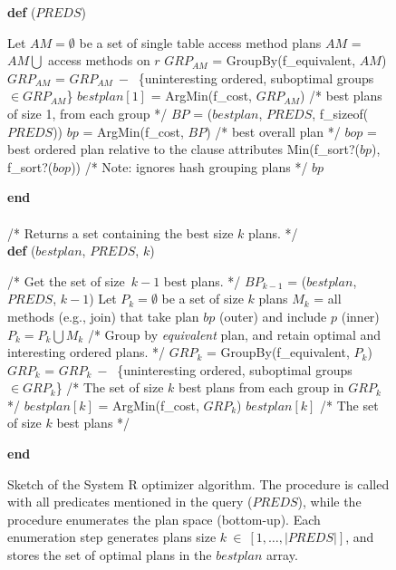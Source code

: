 \begin{figure*}
\ssp
\centering
\begin{boxedminipage}{\linewidth}
  {\bf def} ($PREDS$)
    \begin{algorithmic}[1]
	\STATE Let $AM = \emptyset$ be a set of single table access method plans
		\STATE $AM$ = $AM \bigcup$ access methods on $r$
  	\ENDFOR
	\STATE
	\STATE $GRP_{AM}$ = GroupBy(f\_equivalent, $AM$)
	\STATE $GRP_{AM}$ = $GRP_{AM}\ -\ $ \{uninteresting ordered, suboptimal groups $\in GRP_{AM}$\}
	\STATE $bestplan[1]$ = ArgMin(f\_cost, $GRP_{AM}$) /* best plans of size 1, from each group */
	\STATE $BP$ = ($bestplan$, $PREDS$, f\_sizeof($PREDS$)) 
	\STATE $bp$ = ArgMin(f\_cost, $BP$) /* best overall plan */
	\STATE
		\STATE $bop$ = best ordered plan relative to the clause attributes
		\RETURN Min(f\_sort?($bp$), f\_sort?($bop$)) /* Note: ignores hash grouping plans */
	\ELSE
	 	\RETURN $bp$
	\ENDIF
    \end{algorithmic}
  {\bf end}
  \\
  \\
  /* Returns a set containing the best size $k$ plans. */ \\
  {\bf def} ($bestplan$, $PREDS$, $k$)
    \begin{algorithmic}[1]
	\STATE /* Get the set of size~$k-1$ best plans. */
	\STATE $BP_{k-1}$ = ($bestplan$, $PREDS$, $k-1$)
	\STATE Let $P_{k} = \emptyset$ be a set of size $k$ plans
		\STATE $M_k$ = all methods (e.g., join) that take 
			       plan $bp$ (outer) and include $p$ (inner)
		\STATE $P_{k} = P_{k} \bigcup M_k$ 
		\ENDFOR
	\ENDFOR
	\STATE
	\STATE /* Group by {\em equivalent} plan, and retain optimal and interesting ordered plans. */
	\STATE $GRP_{k}$ = GroupBy(f\_equivalent, $P_{k}$)
	\STATE $GRP_{k}$ = $GRP_{k}\ -\ $ \{uninteresting ordered, suboptimal groups $\in GRP_{k}$\}
	\STATE
	\STATE /* The set of size $k$ best plans from each group in $GRP_k$ */
	\STATE $bestplan[k]$ = ArgMin(f\_cost, $GRP_{k}$) 
	\ENDIF
	\RETURN $bestplan[k]$ /* The set of size $k$ best plans */
      \end{algorithmic}
    {\bf end}
\end{boxedminipage}
\caption{\label{ch:opt:fig:systemr}
Sketch of the System R optimizer algorithm.  The  procedure is called
with all predicates mentioned in the query ($PREDS$), while the  procedure 
enumerates the plan space (bottom-up). Each enumeration step generates plans 
size $k~\in~[1, \ldots, |PREDS|]$, and stores the set of optimal plans in the
$bestplan$ array.
}
\end{figure*}

